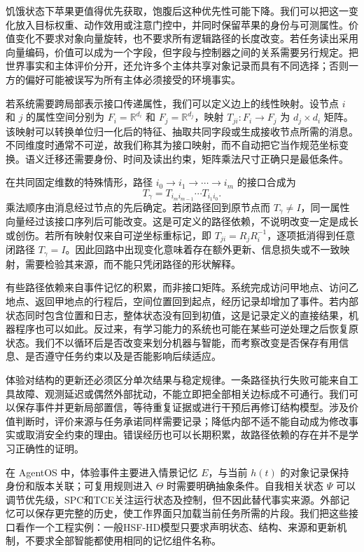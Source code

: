饥饿状态下苹果更值得优先获取，饱腹后这种优先性可能下降。我们可以把这一变化放入目标权重、动作效用或注意门控中，并同时保留苹果的身份与可测属性。价值变化不要求对象向量旋转，也不要求所有逻辑路径的长度改变。若任务读出采用向量编码，价值可以成为一个字段，但字段与控制器之间的关系需要另行规定。把世界事实和主体评价分开，还允许多个主体共享对象记录而具有不同选择；否则一方的偏好可能被误写为所有主体必须接受的环境事实。

若系统需要跨局部表示接口传递属性，我们可以定义边上的线性映射。设节点 $i$ 和 $j$ 的属性空间分别为 $F_i=\mathbb R^{d_i}$ 和 $F_j=\mathbb R^{d_j}$，映射 $T_{ji}:F_i\to F_j$ 为 $d_j\times d_i$ 矩阵。该映射可以转换单位归一化后的特征、抽取共同字段或生成接收节点所需的消息。不同维度时通常不可逆，故我们称其为接口映射，而不自动把它当作规范坐标变换。语义迁移还需要身份、时间及读出约束，矩阵乘法尺寸正确只是最低条件。

在共同固定维数的特殊情形，路径 $i_0\to i_1\to\cdots\to i_m$ 的接口合成为
\[
 T_{\gamma}=T_{i_m i_{m-1}}\cdots T_{i_1 i_0}.
\]
乘法顺序由消息经过节点的先后确定。若闭路径回到原节点而 $T_{\gamma}\ne I$，同一属性向量经过该接口序列后可能改变。这是可定义的路径依赖，不说明改变一定是成长或创伤。若所有映射仅来自可逆坐标重标记，即 $T_{ji}=R_jR_i^{-1}$，逐项抵消得到任意闭路径 $T_{\gamma}=I$。因此回路中出现变化意味着存在额外更新、信息损失或不一致映射，需要检验其来源，而不能只凭闭路径的形状解释。

有些路径依赖来自事件记忆的积累，而非接口矩阵。系统完成访问甲地点、访问乙地点、返回甲地点的行程后，空间位置回到起点，经历记录却增加了事件。若内部状态同时包含位置和日志，整体状态没有回到初值，这是记录定义的直接结果，机器程序也可以如此。反过来，有学习能力的系统也可能在某些可逆处理之后恢复原状态。我们不以循环后是否改变来划分机器与智能，而考察改变是否保存有用信息、是否遵守任务约束以及是否能影响后续适应。

体验对结构的更新还必须区分单次结果与稳定规律。一条路径执行失败可能来自工具故障、观测延迟或偶然外部扰动，不能立即把全部相关边标成不可通行。我们可以保存事件并更新局部置信，等待重复证据或进行干预后再修订结构模型。涉及价值判断时，评价来源与任务承诺同样需要记录；降低内部不适不能自动成为修改事实或取消安全约束的理由。错误经历也可以长期积累，故路径依赖的存在并不是学习正确性的证明。

在 AgentOS 中，体验事件主要进入情景记忆 $E$，与当前 $h(t)$ 的对象记录保持身份和版本关联；可复用规则进入 $\Theta$ 时需要明确抽象条件。自我相关状态 $\Psi$ 可以调节优先级，SPC和TCE关注运行状态及控制，但不因此替代事实来源。外部记忆可以保存更完整的历史，使工作界面只加载当前任务所需的片段。我们把这些接口看作一个工程实例：一般HSF-HD模型只要求声明状态、结构、来源和更新机制，不要求全部智能都使用相同的记忆组件名称。

